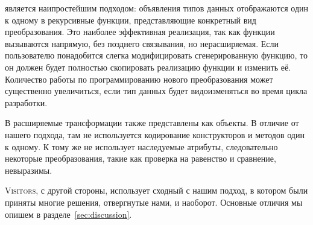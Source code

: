  является наипростейшим подходом: объявления типов данных отображаются один к одному в рекурсивные функции, представляющие конкретный вид преобразования. Это наиболее эффективная реализация, так как функции вызываются напрямую, без позднего связывания, но нерасширяемая. Если пользователю понадобится слегка модифицировать сгенерированную функцию, то он должен будет полностью скопировать реализацию функции и изменить её. Количество работы по программированию нового преобразования может существенно увеличиться, если тип данных будет видоизменяться во время цикла разработки.

В  расширяемые трансформации также представлены как объекты. В отличие от нашего подхода, там не используется кодирование конструкторов и методов один к одному. К тому же  не использует наследуемые атрибуты, следовательно некоторые преобразования, такие как проверка на равенство и сравнение, невыразимы.

\textsc{Visitors}, с другой стороны, использует сходный с нашим подход, в котором были приняты многие решения, отвергнутые нами, и наоборот. Основные отличия мы опишем в разделе~\ref{sec:discussion}.

